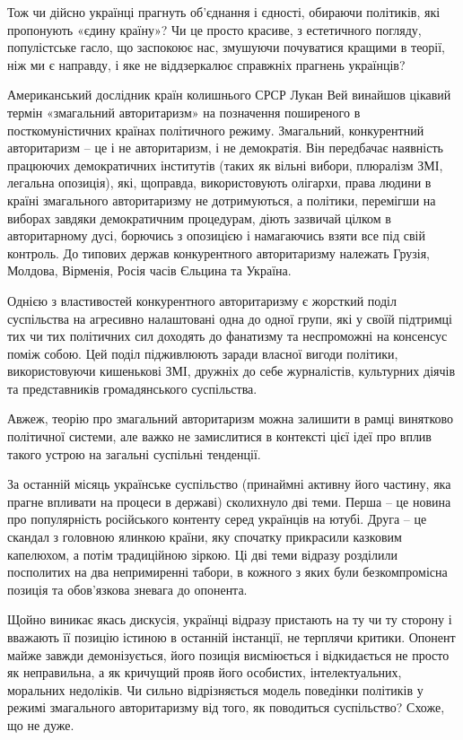 Тож чи дійсно українці прагнуть об'єднання і єдності, обираючи політиків, які
пропонують «єдину країну»? Чи це просто красиве, з естетичного погляду,
популістське гасло, що заспокоює нас, змушуючи почуватися кращими в теорії, ніж
ми є направду, і яке не віддзеркалює справжніх прагнень українців?

Американський дослідник країн колишнього СРСР Лукан Вей винайшов цікавий термін
«змагальний авторитаризм» на позначення поширеного в посткомуністичних країнах
політичного режиму. Змагальний, конкурентний авторитаризм – це і не
авторитаризм, і не демократія. Він передбачає наявність працюючих демократичних
інститутів (таких як вільні вибори, плюралізм ЗМІ, легальна опозиція), які,
щоправда, використовують олігархи, права людини в країні змагального
авторитаризму не дотримуються, а політики, перемігши на виборах завдяки
демократичним процедурам, діють зазвичай цілком в авторитарному дусі, борючись
з опозицією і намагаючись взяти все під свій контроль. До типових держав
конкурентного авторитаризму належать Грузія, Молдова, Вірменія, Росія часів
Єльцина та Україна.

Однією з властивостей конкурентного авторитаризму є жорсткий поділ суспільства
на агресивно налаштовані одна до одної групи, які у своїй підтримці тих чи тих
політичних сил доходять до фанатизму та неспроможні на консенсус поміж собою.
Цей поділ підживлюють заради власної вигоди політики, використовуючи кишенькові
ЗМІ, дружніх до себе журналістів, культурних діячів та представників
громадянського суспільства.

Авжеж, теорію про змагальний авторитаризм можна залишити в рамці винятково
політичної системи, але важко не замислитися в контексті цієї ідеї про вплив
такого устрою на загальні суспільні тенденції.

За останній місяць українське суспільство (принаймні активну його частину, яка
прагне впливати на процеси в державі) сколихнуло дві теми. Перша – це новина
про популярність російського контенту серед українців на ютубі. Друга – це
скандал з головною ялинкою країни, яку спочатку прикрасили казковим капелюхом,
а потім традиційною зіркою. Ці дві теми відразу розділили посполитих на два
непримиренні табори, в кожного з яких були безкомпромісна позиція та
обов'язкова зневага до опонента.

Щойно виникає якась дискусія, українці відразу пристають на ту чи ту сторону і
вважають її позицію істиною в останній інстанції, не терплячи критики. Опонент
майже завжди демонізується, його позиція висміюється і відкидається не просто
як неправильна, а як кричущий прояв його особистих, інтелектуальних, моральних
недоліків. Чи сильно відрізняється модель поведінки політиків у режимі
змагального авторитаризму від того, як поводиться суспільство? Схоже, що не
дуже.


